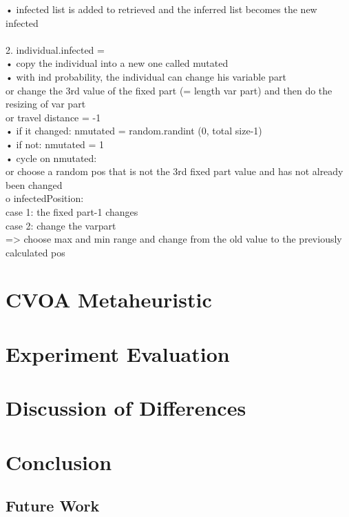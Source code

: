 \documentclass[letterpaper]{article}%
\begin{document}
• infected list is added to retrieved and the inferred list becomes the new infected\\
\\
2. individual.infected =\\
• copy the individual into a new one called mutated\\
• with ind probability, the individual can change his variable part\\
or change the 3rd value of the fixed part (= length var part) and then do the resizing of var part\\
or travel distance = -1\\
• if it changed: nmutated = random.randint (0, total size-1)\\
• if not: nmutated = 1\\
• cycle on nmutated:\\
or choose a random pos that is not the 3rd fixed part value and has not already been changed\\
o infectedPosition:\\
case 1: the fixed part-1 changes\\
case 2: change the varpart\\
=> choose max and min range and change from the old value to the previously calculated pos\\

\section{CVOA Metaheuristic}

\section{Experiment Evaluation}

\section{Discussion of Differences}

\section{Conclusion}

\subsection{Future Work}

\printbibliography
\end{document}
